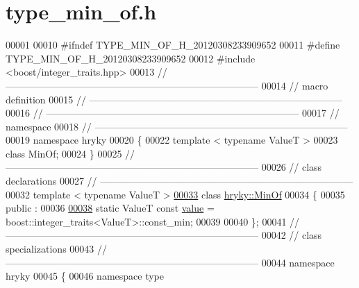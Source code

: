 \hypertarget{type__min__of_8h_source}{\section{type\-\_\-min\-\_\-of.\-h}
}

\begin{DoxyCode}
00001 
00010 \textcolor{preprocessor}{#ifndef TYPE\_MIN\_OF\_H\_20120308233909652}
00011 \textcolor{preprocessor}{}\textcolor{preprocessor}{#define TYPE\_MIN\_OF\_H\_20120308233909652}
00012 \textcolor{preprocessor}{}\textcolor{preprocessor}{#include <boost/integer\_traits.hpp>}
00013 \textcolor{comment}{//
      ------------------------------------------------------------------------------}
00014 \textcolor{comment}{// macro definition}
00015 \textcolor{comment}{//
      ------------------------------------------------------------------------------}
00016 \textcolor{comment}{//
      ------------------------------------------------------------------------------}
00017 \textcolor{comment}{// namespace}
00018 \textcolor{comment}{//
      ------------------------------------------------------------------------------}
00019 \textcolor{keyword}{namespace }hryky
00020 \{
00022     \textcolor{keyword}{template} < \textcolor{keyword}{typename} ValueT >
00023     \textcolor{keyword}{class }MinOf;
00024 \}
00025 \textcolor{comment}{//
      ------------------------------------------------------------------------------}
00026 \textcolor{comment}{// class declarations}
00027 \textcolor{comment}{//
      ------------------------------------------------------------------------------}
00032 \textcolor{comment}{}\textcolor{keyword}{template} < \textcolor{keyword}{typename} ValueT >
\hypertarget{type__min__of_8h_source_l00033}{}\hyperlink{classhryky_1_1_min_of}{00033} \textcolor{keyword}{class }\hyperlink{classhryky_1_1_min_of}{hryky::MinOf}
00034 \{
00035 \textcolor{keyword}{public} :
00036 
\hypertarget{type__min__of_8h_source_l00038}{}\hyperlink{classhryky_1_1_min_of_a1bd351b969c43e1cf591ae396045b964}{00038}     \textcolor{keyword}{static} ValueT \textcolor{keyword}{const} \hyperlink{classhryky_1_1_min_of_a1bd351b969c43e1cf591ae396045b964}{value} = boost::integer\_traits<ValueT>::const\_min;
00039 
00040 \};
00041 \textcolor{comment}{//
      ------------------------------------------------------------------------------}
00042 \textcolor{comment}{// class specializations}
00043 \textcolor{comment}{//
      ------------------------------------------------------------------------------}
00044 \textcolor{keyword}{namespace }hryky
00045 \{
00046 \textcolor{keyword}{namespace }type

\end{DoxyCode}
